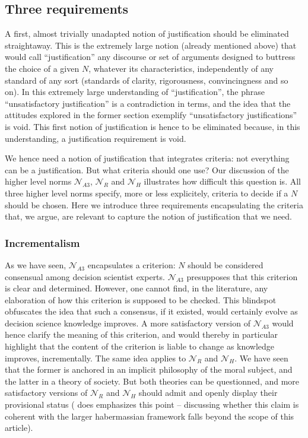 \documentclass[preprint, french, english, 11pt, authoryear]{elsarticle}%
\begin{document}
\subsection{Three requirements}
A first, almost trivially unadapted notion of justification should be eliminated straightaway. This is the extremely large notion (already mentioned above) that would call ``justification'' any discourse or set of arguments designed to buttress the choice of a given $N$, whatever its characteristics, independently of any standard of any sort (standards of clarity, rigorousness, convincingness and so on). In this extremely large understanding of ``justification'', the phrase ``unsatisfactory justification'' is a contradiction in terms, and the idea that the attitudes explored in the former section exemplify ``unsatisfactory justifications'' is void. This first notion of justification is hence to be eliminated because, in this understanding, a justification requirement is void.

We hence need a notion of justification that integrates criteria: not everything can be a justification. But what criteria should one use? Our discussion of the higher level norms $\mathscr{N}_{A3}$, $\mathscr{N}_{R}$ and $\mathscr{N}_{H}$ illustrates how difficult this question is. All three higher level norms specify, more or less explicitely, criteria to decide if a $N$ should be chosen. Here we introduce three requirements encapsulating the criteria that, we argue, are relevant to capture the notion of justification that we need.

\subsubsection{Incrementalism}
As we have seen, $\mathscr{N}_{A3}$ encapsulates a criterion: $N$ should be considered consensual among decision scientist experts. $\mathscr{N}_{A3}$ presupposes that this criterion is clear and determined. However, one cannot find, in the literature, any elaboration of how this criterion is supposed to be checked. This blindspot obfuscates the idea that such a consensus, if it existed, would certainly evolve as decision science knowledge improves. A more satisfactory version of $\mathscr{N}_{A3}$ would hence clarify the meaning of this criterion, and would thereby in particular highlight that the content of the criterion is liable to change as knowledge improves, incrementally. The same idea applies to $\mathscr{N}_{R}$ and $\mathscr{N}_{H}$. We have seen that the former is anchored in an implicit philosophy of the moral subject, and the latter in a theory of society. But both theories can be questionned, and more satisfactory versions of $\mathscr{N}_{R}$ and $\mathscr{N}_{H}$ should admit and openly display their provisional status (\cite{habermas_moralbewustsein_1983} does emphasizes this point -- discussing whether this claim is coherent with the larger habermassian framework falls beyond the scope of this article).
\end{document}
